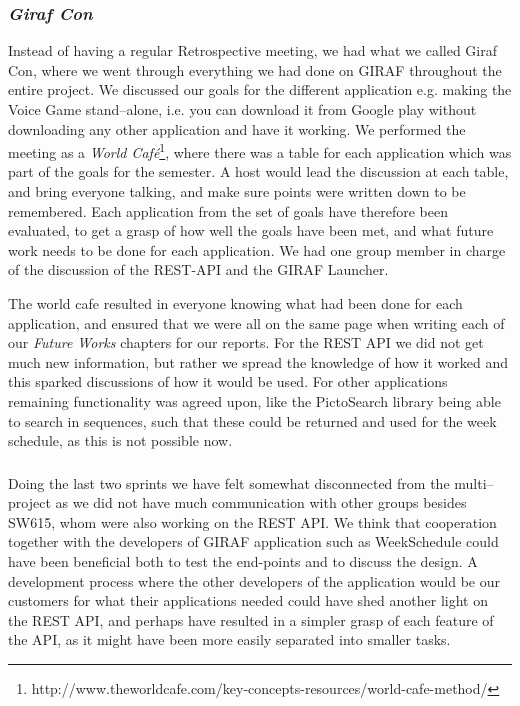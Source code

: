 \subsubsection*{\textit{Giraf Con}}
Instead of having a regular Retrospective meeting, we had what we called Giraf Con, where we went through everything we had done on GIRAF throughout the entire project.
We discussed our goals for the different application e.g. making the Voice Game stand--alone, i.e. you can download it from Google play without downloading any other application and have it working. 
We performed the meeting as a \textit{World Café}\footnote{http://www.theworldcafe.com/key-concepts-resources/world-cafe-method/}, where there was a table for each application which was part of the goals for the semester.
A host would lead the discussion at each table, and bring everyone talking, and make sure points were written down to be remembered.
Each application from the set of goals have therefore been evaluated, to get a grasp of how well the goals have been met, and what future work needs to be done for each application.
We had one group member in charge of the discussion of the REST-API and the GIRAF Launcher.

The world cafe resulted in everyone knowing what had been done for each application, and ensured that we were all on the same page when writing each of our \textit{Future Works} chapters for our reports. 
For the REST API we did not get much new information, but rather we spread the knowledge of how it worked and this sparked discussions of how it would be used.
For other applications remaining functionality was agreed upon, like the PictoSearch library being able to search in sequences, such that these could be returned and used for the week schedule, as this is not possible now.

\subsubsection*{}
Doing the last two sprints we have felt somewhat disconnected from the multi--project as we did not have much communication with other groups besides SW615, whom were also working on the REST API.
We think that cooperation together with the developers of GIRAF application such as WeekSchedule could have been beneficial both to test the end-points and to discuss the design.
A development process where the other developers of the application would be our customers for what their applications needed could have shed another light on the REST API, and perhaps have resulted in a simpler grasp of each feature of the API, as it might have been more easily separated into smaller tasks.


